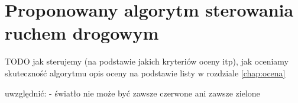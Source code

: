 \chapter{Proponowany algorytm sterowania ruchem drogowym}
TODO jak sterujemy (na podstawie jakich kryteriów oceny itp), jak oceniamy skuteczność algorytmu
opis oceny na podstawie listy w rozdziale \ref{chap:ocena}

uwzględnić: - światło nie może być zawsze czerwone ani zawsze zielone